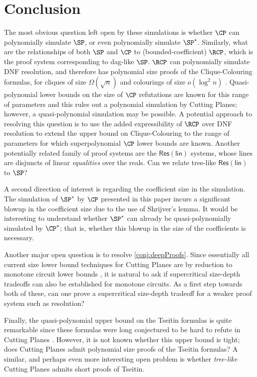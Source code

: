 \section{Conclusion}
The most obvious question left open by these simulations is whether $\CP$ can polynomially simulate $\SP$, or even polynomially simulate $\SP^*$. 
Similarly, what are the relationships of both $\SP$ and $\CP$ to (bounded-coefficient) $\RCP$, which is the proof system corresponding to dag-like $\SP$. 
$\RCP$ can polynomially simulate DNF resolution, and therefore has polynomial size proofs of the Clique-Colouring formulas, for cliques of size $\Omega(\sqrt{n})$ and colourings of size $o(\log^2 n)$ \cite{AtseriasBE02}. 
Quasi-polynomial lower bounds on the size of $\CP$ refutations are known for this range of parameters and this rules out a polynomial simulation by Cutting Planes; however, a quasi-polynomial simulation may be possible. A potential approach to resolving this question is to use the added expressibility of $\RCP$ over DNF resolution to extend the upper bound on Clique-Colouring to the range of parameters for which superpolynomial $\CP$ lower bounds are known.
Another potentially related family of proof systems are the $\mathsf{Res(lin)}$ systems, whose lines are disjuncts of linear \emph{equalities} over the reals.
Can we relate tree-like $\mathsf{Res(lin)}$ to $\SP$?

A second direction of interest is regarding the coefficient size in the simulation. The simulation of $\SP^*$ by $\CP$ presented in this paper incurs a significant blowup in the coefficient size due to the use of Shrijver's lemma. It would be interesting to understand whether $\SP^*$ can already be quasi-polynomially simulated by $\CP^*$; that is, whether this blowup in the size of the coefficients is necessary.

Another major open question is to resolve \autoref{conj:deepProofs}. Since essentially all current size lower bound techniques for Cutting Planes are by reduction to monotone circuit lower bounds \cite{Pudlak97, FlemingPPR17,HrubesP17,GargGKS18}, it is natural to ask if supercritical size-depth tradeoffs can also be established for monotone circuits. As a first step towards both of these, can one prove a supercritical size-depth tradeoff for a weaker proof system such as resolution?

Finally, the quasi-polynomial upper bound on the Tseitin formulas \cite{TseitinUpperBound} is quite remarkable since these formulas were long conjectured to be hard to refute in Cutting Planes \cite{CookCT87}. However, it is not known whether this upper bound is tight; does Cutting Planes admit polynomial size proofs of the Tseitin formulas? A similar, and perhaps even more interesting open problem is whether \emph{tree-like} Cutting Planes admits short proofs of Tseitin. 


 


